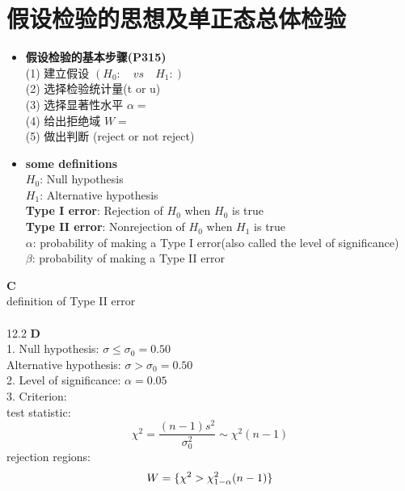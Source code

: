 \documentclass[a4paper]{ctexart}    %
\begin{document}
	\section{假设检验的思想及单正态总体检验}
	\begin{tcolorbox}
		[
		colframe=blue!25,
		colback=blue!10,
		coltitle=blue!20!black,  
		fonttitle=\bfseries,
		adjusted title=Formula Or Theorem:
		]
		\begin{itemize}
			\item \textbf{假设检验的基本步骤(P315)} \\
			(1) \quad 建立假设 $ (H_0: \quad vs \quad H_1:) $\\
			(2) \quad 选择检验统计量(t or u) \\
			(3) \quad 选择显著性水平 $ \alpha =  $\\
			(4) \quad 给出拒绝域 $ W = $\\
			(5) \quad 做出判断 (reject or not reject)
			\item \textbf{some definitions} \\
			\textbf{$ H_0 $}: Null hypothesis \\
			\textbf{$ H_1 $}: Alternative hypothesis \\
			\textbf{Type I error}: Rejection of $ H_0 $ when $ H_0 $ is true \\
			\textbf{Type II error}: Nonrejection of $ H_0 $ when $ H_1 $ is true \\
			$ \alpha $: probability of making a Type I error(also called the level of significance) \\
			$ \beta $: probability of making a Type II error
		\end{itemize}
	\end{tcolorbox}
	 \quad \textbf{C} \\
	definition of Type II error \\ \\
	12.2 \quad \textbf{D} \\
	1. Null hypothesis: $ \sigma \leq \sigma_0 = 0.50 $ \\
	Alternative hypothesis: $ \sigma > \sigma_0 = 0.50 $ \\
	2. Level of significance: $ \alpha = 0.05 $ \\
	3. Criterion: \\
	test statistic:
	\begin{equation*}
		\chi^2 = \frac{(n-1)s^2}{\sigma_0^2} \sim \chi^2(n-1)
	\end{equation*}
	rejection regions:
	\begin{equation*}
		W = \{\chi^2 > \chi_{1-\alpha}^2(n-1)\} \\
	\end{equation*}
\end{document}
